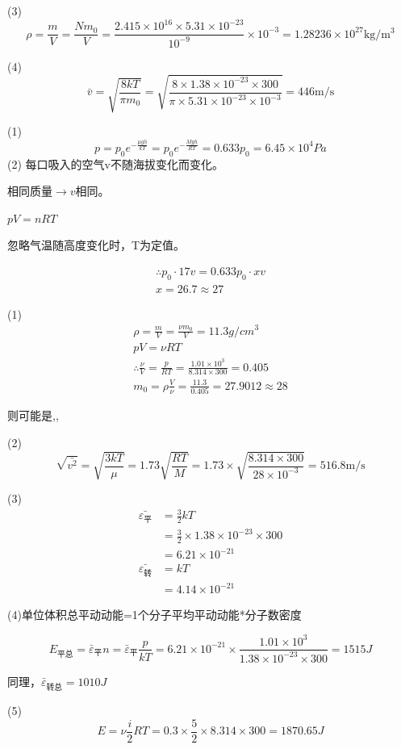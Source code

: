 (3)
$$
\rho = \frac { m } { V } = \frac { N m _ { 0 } } { V } = \frac { 2.415 \times 10 ^ { 16 } \times 5.31 \times 10 ^ { - 23 } } { 10 ^ { - 9 } } \times 10 ^ { - 3 } = 1.28236 \times 10 ^ { 27 } \mathrm { kg } / \mathrm { m } ^ { 3 }
$$

(4)
$$
\bar { v } = \sqrt { \frac { 8 k T } { \pi m _ { 0 } } } = \sqrt { \frac { 8 \times 1.38 \times 10 ^ { - 23 } \times 300 } { \pi \times 5.31 \times 10 ^ { - 23 } \times 10 ^ { - 3 } } } = 446 \mathrm { m } / \mathrm { s }
$$

\exercise

\solve
(1)
$$
p = p _ { 0 } e ^ { - \frac { \mu g h } { k T } } = p _ { 0 } e ^ { - \frac { M g h } { R T } } = 0.633 p _ { 0 } = 6.45 \times 10 ^ { 4 } P a
$$
(2)
每口吸入的空气v不随海拔变化而变化。

相同质量$\rightarrow v $相同。

$pV=nRT$

忽略气温随高度变化时，T为定值。

$$
\begin{array}{l}
\therefore p_{0}\cdot 17 v =0.633p_0 \cdot x v\\
{ x = 26.7 \approx 27} 
\end{array}
$$
\exercise

\solve
(1)
$$
\begin{array} { c } { \rho = \frac { m } { V } = \frac { \nu m _ { 0 } } { V } = 11.3 g / c m ^ { 3 } } \\ { p V = \nu R T } \\ { \therefore \frac { \nu } { V } = \frac { p } { R T } = \frac { 1.01 \times 10 ^ { 3 } } { 8.314 \times 300 } = 0.405 } \\ { m _ { 0 } = \rho \frac { V } { \nu } = \frac { 11.3 } { 0.405 } = 27.9012 \approx 28 } \end{array}
$$

则可能是,,

(2)
$$
\sqrt{\bar{v^{2}}}=\sqrt {\frac{3kT}{\mu}}=1.73\sqrt {\frac{RT}{M}}=1.73\times\sqrt{\frac{8.314\times 300}{28\times10^{-3}}}=516.8\mathrm{m}/\mathrm{s}
$$

(3)
\begin{align*}
\bar{\varepsilon_{\mbox{平}}}&=\frac{3}{2}kT\\
&=\frac{3}{2}\times 1.38\times 10^{-23}\times 300\\
&=6.21\times 10^{-21}\\
\bar{\varepsilon_{\mbox{转}}}&=kT\\
&=4.14\times 10^{-21}
\end{align*}

(4)单位体积总平动动能=1个分子平均平动动能*分子数密度

$$E_{\mbox{平总}}=\bar { \varepsilon } _ {\mbox{平}}n=\bar { \varepsilon } _ {\mbox{平}}\frac{p}{kT}=6.21 \times 10 ^ { - 21 } \times \frac { 1.01 \times 10 ^ { 3 } } { 1.38 \times 10 ^ { - 23 } \times 300 } = 1515 J$$

同理，$\bar { \varepsilon } _ {\mbox{转总}}=1010J$

(5)
$$
E = \nu \frac { i } { 2 } R T = 0.3 \times \frac { 5 } { 2 } \times 8.314 \times 300 = 1870.65 J
$$